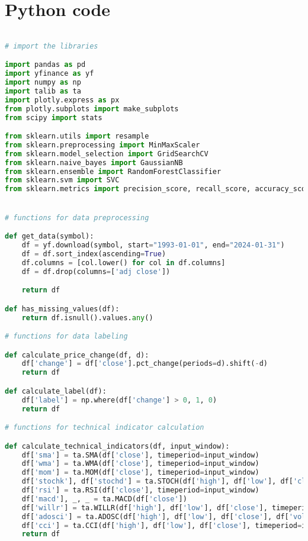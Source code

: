 \section{Python code}
\label{sec:app}
\begin{lstlisting}[language=Python]

# import the libraries

import pandas as pd
import yfinance as yf
import numpy as np
import talib as ta
import plotly.express as px
from plotly.subplots import make_subplots
from scipy import stats

from sklearn.utils import resample
from sklearn.preprocessing import MinMaxScaler
from sklearn.model_selection import GridSearchCV
from sklearn.naive_bayes import GaussianNB
from sklearn.ensemble import RandomForestClassifier
from sklearn.svm import SVC
from sklearn.metrics import precision_score, recall_score, accuracy_score, f1_score, roc_auc_score


# functions for data preprocessing

def get_data(symbol):
    df = yf.download(symbol, start="1993-01-01", end="2024-01-31")
    df = df.sort_index(ascending=True)
    df.columns = [col.lower() for col in df.columns]
    df = df.drop(columns=['adj close']) 

    return df

def has_missing_values(df):
    return df.isnull().values.any()

# functions for data labeling

def calculate_price_change(df, d):
    df['change'] = df['close'].pct_change(periods=d).shift(-d)
    return df

def calculate_label(df):
    df['label'] = np.where(df['change'] > 0, 1, 0)
    return df

# functions for technical indicator calculation

def calculate_technical_indicators(df, input_window):
    df['sma'] = ta.SMA(df['close'], timeperiod=input_window)
    df['wma'] = ta.WMA(df['close'], timeperiod=input_window)
    df['mom'] = ta.MOM(df['close'], timeperiod=input_window)
    df['stochk'], df['stochd'] = ta.STOCH(df['high'], df['low'], df['close'], fastk_period=14, slowk_period=3, slowd_period=3)
    df['rsi'] = ta.RSI(df['close'], timeperiod=input_window)
    df['macd'], _, _ = ta.MACD(df['close'])
    df['willr'] = ta.WILLR(df['high'], df['low'], df['close'], timeperiod=input_window)
    df['adosci'] = ta.ADOSC(df['high'], df['low'], df['close'], df['volume'], fastperiod=3, slowperiod=10)
    df['cci'] = ta.CCI(df['high'], df['low'], df['close'], timeperiod=input_window)
    return df


\end{lstlisting}
